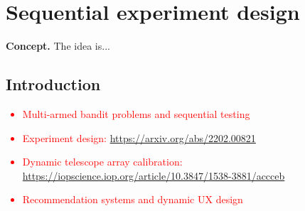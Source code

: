 \chapter{\sffamily Sequential experiment design}

{\bfseries\sffamily Concept.} The idea is...

\section{\sffamily Introduction}

\textcolor{red}{
\begin{itemize}
\item{Multi-armed bandit problems and sequential testing}
\item{Experiment design: \url{https://arxiv.org/abs/2202.00821}}
\item{Dynamic telescope array calibration: \url{https://iopscience.iop.org/article/10.3847/1538-3881/accceb}}
\item{Recommendation systems and dynamic UX design} 
\end{itemize}
}